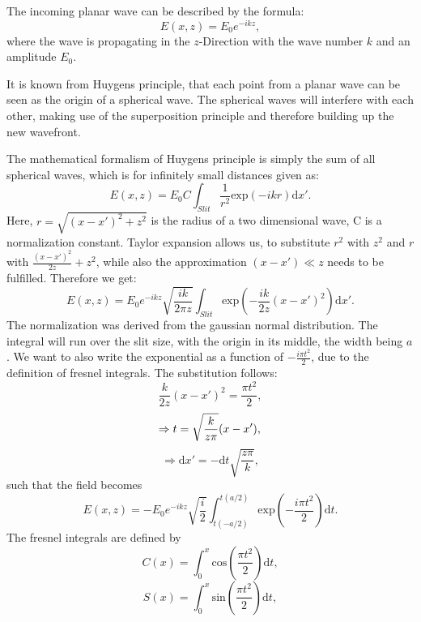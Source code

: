 The incoming planar wave can be described by the formula:
\begin{equation}
E(x,z) = E_0 e^{-ikz},
\end{equation}
where the wave is propagating in the $z$-Direction with the wave number $k$ and an amplitude $E_0$.

It is known from Huygens principle, that each point from a planar wave can be seen as the origin of a spherical wave. The spherical waves will interfere with each other, making use of the superposition principle and therefore building up the new wavefront.

The mathematical formalism of Huygens principle is simply the sum of all spherical waves, which is for infinitely small distances given as:
\begin{equation}
E(x,z) = E_0 C \int_{Slit} \frac{1}{r^2} \mathrm{exp}(-ikr)\mathrm{d}x'.
\end{equation}
Here, $r=\sqrt{(x-x')^2 + z^2}$ is the radius of a two dimensional wave, C is a normalization constant.
Taylor expansion allows us, to substitute $r^2$ with $z^2$ and $r$ with $\frac{(x-x')^2}{2z} + z^2$, while also the approximation $(x-x') \ll z$ needs to be fulfilled. Therefore we get:
\begin{equation}
E(x,z) = E_0 e^{-ikz}\sqrt{\frac{ik}{2\pi z}}\int_{Slit} \mathrm{exp}(-\frac{ik}{2z}(x-x')^2)\mathrm{d}x'.
\end{equation}
The normalization was derived from the gaussian normal distribution. The integral will run over the slit size, with the origin in its middle, the width being $a$.
We want to also write the exponential as a function of $-\frac{i\pi t^2}{2}$, due to the definition of fresnel integrals. The substitution follows:
\begin{equation}
\frac{k}{2z}(x-x')^2 = \frac{\pi t^2}{2},
\end{equation}
\begin{equation}
\Rightarrow t = \sqrt{\frac{k}{z\pi}}(x-x'), \\
\end{equation}
\begin{equation}
\Rightarrow \mathrm{d}x' = -\mathrm{d}t \sqrt{\frac{z\pi}{k}},
\end{equation}
such that the field becomes
\begin{equation}
E(x,z) = -E_0 e^{-ikz}\sqrt{\frac{i}{2}}\int_{t(-a/2)}^{t(a/2)} \mathrm{exp}(-\frac{i\pi t^2}{2})\mathrm{d}t.
\end{equation}
The fresnel integrals are defined by
\begin{equation}
C(x) = \int_0^x \mathrm{cos}(\frac{\pi t^2}{2})\mathrm{d}t,
\end{equation}
\begin{equation}
S(x) = \int_0^x \mathrm{sin}(\frac{\pi t^2}{2})\mathrm{d}t,
\end{equation}

